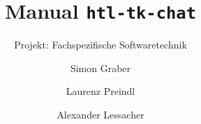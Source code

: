 \documentclass[a4paper,ngerman,headsepline]{scrreprt}
\begin{document}
\titlehead{HTL Anichstraße \hfill Wintersemester 2020\\
Abteilung Elektronik \& techn. Informatik\hfill Sommersemester 2021}
\title{Manual \texttt{htl-tk-chat}}
\subtitle{Projekt: Fachspezifische Softwaretechnik}
\author{Simon Graber \and Laurenz Preindl \and Alexander Lessacher}

\maketitle
\end{document}
